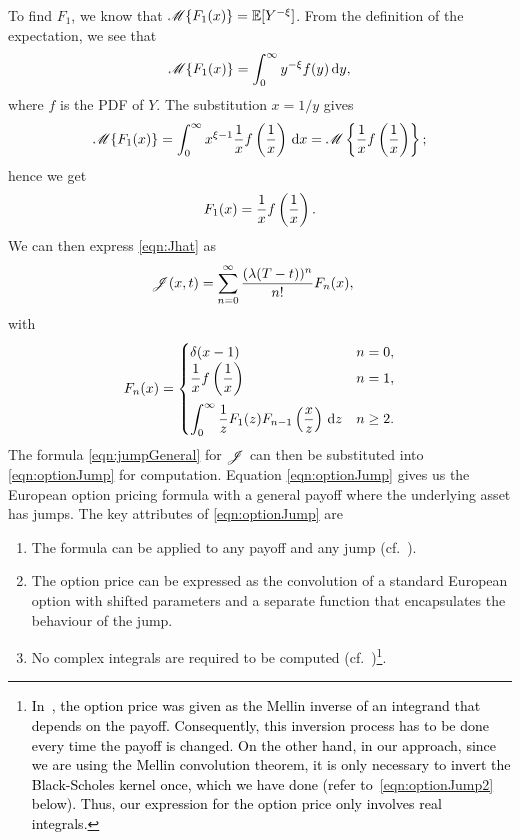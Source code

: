 To find $F_1$, we know that $\mathscr M \{ F_1(x) \} = \mathbb E[Y^{-\xi}]$. From the definition of the expectation, we see that\begin{equation*}
		\mathscr M \{ F_1(x) \} = \int_0^\infty y^{-\xi} f(y) \, \mathrm d y,
	\end{equation*}
where $f$ is the PDF of $Y$. The substitution $x = 1/y$ gives
	\begin{equation*}
		\mathscr M \{ F_1(x) \} = \int_0^\infty x^{\xi-1} \frac{1}{x}f\left( \frac{1}{x} \right) \, \mathrm d x = \mathscr M \left\{ \frac{1}{x} f\left( \frac{1}{x} \right) \right\};
	\end{equation*}
hence we get
	\begin{equation*}
		F_1(x) = \frac{1}{x}f\left(\frac{1}{x}\right).
	\end{equation*}
We can then express \eqref{eqn:Jhat} as
	\begin{align}
		\label{eqn:jumpGeneral}
		\begin{split}
		&\mathscr J(x,t) =  \displaystyle\sum\limits_{n=0}^{\infty} \frac{(\lambda(T-t))^n}{n!}F_n(x),
		\end{split}
	\end{align}
with
	\begin{equation}
		\label{eqn:Fn}
		F_n(x) =
			\begin{cases}
				\ds\delta(x-1) & n = 0, \\ \vspace{0.2cm}
				\ds\fr{1}{x}f\left(\fr{1}{x}\right) & n = 1, \\
				\ds\int_0^\infty \fr{1}{z}F_1(z)F_{n-1}\left(\fr{x}{z}\right) \, \d z & n \geq 2.
			\end{cases}
	\end{equation}
The formula \eqref{eqn:jumpGeneral} for $\mathscr J$ can then be substituted into \eqref{eqn:optionJump} for computation. Equation \eqref{eqn:optionJump} gives us the European option pricing formula with a general payoff where the underlying asset has jumps.
The key attributes of \eqref{eqn:optionJump} are
	\begin{enumerate}
		\item The formula can be applied to any payoff and any jump (cf.~\cite{Merton1976, Kou2002, Kou2004}).
		\item The option price can be expressed as the convolution of a standard European option with shifted parameters and a separate function that encapsulates the behaviour of the jump.
		\item No complex integrals are required to be computed (cf.~\cite{Frontczak2013})\footnote{\textcolor{black}{In~\cite{Frontczak2013}, the option price was given as the Mellin inverse of an integrand that depends on the payoff. Consequently, this inversion process has to be done every time the payoff is changed. On the other hand, in our approach, since we are using the Mellin convolution theorem, it is only necessary to invert the Black-Scholes kernel once, which we have done (refer to~\eqref{eqn:optionJump2} below). Thus, our expression for the option price only involves real integrals.}}.
	\end{enumerate}
